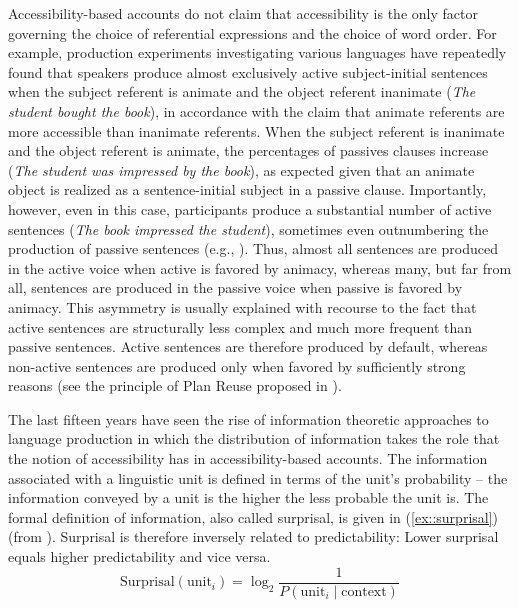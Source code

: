 \documentclass[output=paper,colorlinks,citecolor=brown]{langscibook}
\begin{document}
Accessibility-based accounts do not claim that accessibility is the only factor governing the choice of referential expressions and the choice of word order. For example, production experiments investigating various languages have repeatedly found that speakers produce almost exclusively active subject-initial sentences when the subject referent is animate and the object referent inanimate (\textit{The student bought the book}), in accordance with the claim that animate referents are more accessible than inanimate referents. When the subject referent is inanimate and the object referent is animate, the percentages of passives clauses increase (\textit{The student was impressed by the book}), as expected given that an animate object is realized as a sentence-initial subject in a passive clause. Importantly, however, even in this case, participants produce a substantial number of active sentences (\textit{The book impressed the student}), sometimes even outnumbering the production of passive sentences (e.g., \citealt{McDonald::al-93, Ferreira-94}). Thus, almost all sentences are produced in the active voice when active is favored by animacy, whereas many, but far from all, sentences are produced in the passive voice when passive is favored by animacy. This asymmetry is usually explained with recourse to the fact that active sentences are structurally less complex and much more frequent than passive sentences. Active sentences are therefore produced by default, whereas non-active sentences are produced only when favored by sufficiently strong reasons (see the principle of Plan Reuse proposed in \citealt{MacDonald-13-How-language-production}).

The last fifteen years have seen the rise of information theoretic approaches to language production in which the distribution of information takes the role that the notion of accessibility has in accessibility-based accounts. The information associated with a linguistic unit is defined in terms of the unit's probability -- the information conveyed by a unit is the higher the less probable the unit is. The formal definition of information, also called surprisal, is given in (\ref{ex::surprisal}) (from \citealt{Crocker::al-16}). Surprisal is therefore inversely related to predictability: Lower surprisal equals higher predictability and vice versa.
\begin{equation}
\text{Surprisal}(\text{unit}_i) = \log_2\dfrac{1}{P(\text{unit}_i\mid \text{context})}\label{ex::surprisal}
\end{equation}
\end{document}
